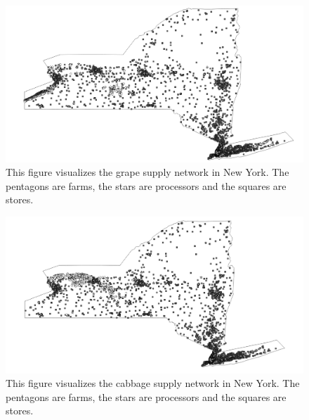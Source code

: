 \documentclass{report}
\begin{document}
\begin{figure}
\centering
\begin{framed}
\includegraphics[scale=.50]{network_69}
\caption{This figure visualizes the grape supply network in New York. The pentagons are farms, the stars are processors and the squares are stores. }
\label{fig:network_69}
\end{framed}
\end{figure}

\begin{figure}
\centering
\begin{framed}
\includegraphics[scale=.50]{network_243}
\caption{This figure visualizes the cabbage supply network in New York. The pentagons are farms, the stars are processors and the squares are stores.}
\label{fig:network_243}
\end{framed}
\end{figure}

\end{document}
